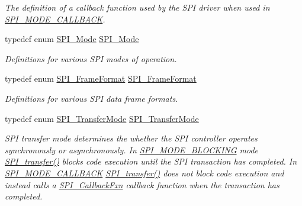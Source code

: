 \begin{DoxyCompactItemize}
\begin{DoxyCompactList}\small\item\em The definition of a callback function used by the S\-P\-I driver when used in \hyperlink{_s_p_i_8h_ab9ea76c6529d6076eee5e1c4a5a92c6fa5631e69925c47a62a261c78ebbda39fb}{S\-P\-I\-\_\-\-M\-O\-D\-E\-\_\-\-C\-A\-L\-L\-B\-A\-C\-K}. \end{DoxyCompactList}\item 
typedef enum \hyperlink{_s_p_i_8h_a60a7e3d74577b38aa79ea6983362f942}{S\-P\-I\-\_\-\-Mode} \hyperlink{_s_p_i_8h_aa336fc399a0b2b1b5442f8a1e169984f}{S\-P\-I\-\_\-\-Mode}
\begin{DoxyCompactList}\small\item\em Definitions for various S\-P\-I modes of operation. \end{DoxyCompactList}\item 
typedef enum \hyperlink{_s_p_i_8h_a4e1f33555dfa8147205af5b266f3a489}{S\-P\-I\-\_\-\-Frame\-Format} \hyperlink{_s_p_i_8h_a53949638d43ae7bf71b74c2b136ad206}{S\-P\-I\-\_\-\-Frame\-Format}
\begin{DoxyCompactList}\small\item\em Definitions for various S\-P\-I data frame formats. \end{DoxyCompactList}\item 
typedef enum \hyperlink{_s_p_i_8h_ab9ea76c6529d6076eee5e1c4a5a92c6f}{S\-P\-I\-\_\-\-Transfer\-Mode} \hyperlink{_s_p_i_8h_a03fe641fa0950b2fe6c1b596cc5c235b}{S\-P\-I\-\_\-\-Transfer\-Mode}
\begin{DoxyCompactList}\small\item\em S\-P\-I transfer mode determines the whether the S\-P\-I controller operates synchronously or asynchronously. In \hyperlink{_s_p_i_8h_ab9ea76c6529d6076eee5e1c4a5a92c6fa0dfb2358e008316426895e7237c398e8}{S\-P\-I\-\_\-\-M\-O\-D\-E\-\_\-\-B\-L\-O\-C\-K\-I\-N\-G} mode \hyperlink{_s_p_i_8h_a989e17f96b54fcc3dc2cac5f8ac6bdb2}{S\-P\-I\-\_\-transfer()} blocks code execution until the S\-P\-I transaction has completed. In \hyperlink{_s_p_i_8h_ab9ea76c6529d6076eee5e1c4a5a92c6fa5631e69925c47a62a261c78ebbda39fb}{S\-P\-I\-\_\-\-M\-O\-D\-E\-\_\-\-C\-A\-L\-L\-B\-A\-C\-K} \hyperlink{_s_p_i_8h_a989e17f96b54fcc3dc2cac5f8ac6bdb2}{S\-P\-I\-\_\-transfer()} does not block code execution and instead calls a \hyperlink{_s_p_i_8h_aeb03e7608a14021c3b0acf92c90e2168}{S\-P\-I\-\_\-\-Callback\-Fxn} callback function when the transaction has completed. \end{DoxyCompactList}\item 

\end{DoxyCompactItemize}
